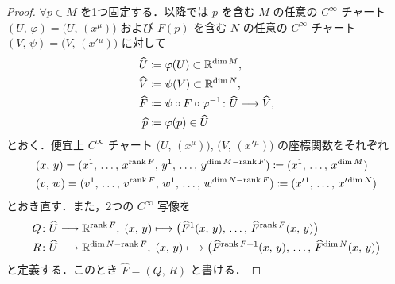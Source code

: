 \documentclass[TQFT_main]{subfiles}
\begin{document}
\begin{proof}
    $\forall p \in M$ を1つ固定する．以降では $p$ を含む $M$ の任意の $C^\infty$ チャート $(U,\, \varphi) = \bigl( U,\, (x^\mu) \bigr) $ および $F(p)$ を含む $N$ の任意の $C^\infty$ チャート $(V,\, \psi) = \bigl( V,\, (x'{}^\mu) \bigr) $ に対して
    \begin{align}
        \widehat{U} &\coloneqq \varphi(U) \subset \mathbb{R}^{\dim M}, \\
        \widehat{V} &\coloneqq \psi(V) \subset \mathbb{R}^{\dim N}, \\
        \widehat{F} &\coloneqq \psi \circ F \circ \varphi^{-1} \colon \widehat{U} \longrightarrow \widehat{V}, \\
        \widehat{p} &\coloneqq \varphi(p) \in \widehat{U}
    \end{align}
    とおく．便宜上 $C^\infty$ チャート $\bigl(U,\, (x^\mu)\bigr),\, \bigl(V,\, (x'{}^\mu)\bigr)$ の座標関数をそれぞれ
    \begin{align}
        &(x,\, y) = (x^1,\, \dots,\, x^{\rank F},\, y^1,\, \dots,\, y^{\dim M - \rank F})
        \coloneqq (x^1,\, \dots,\, x^{\dim M})  \\
        &(v,\, w) = (v^1,\, \dots,\, v^{\rank F},\, w^1,\, \dots,\, w^{\dim N - \rank F})
        \coloneqq (x'{}^1,\, \dots,\, x'{}^{\dim N}) 
    \end{align}
    とおき直す．また，2つの $C^\infty$ 写像を
    \begin{align}
        Q \colon \widehat{U} &\longrightarrow \mathbb{R}^{\rank F},\; (x,\, y) \longmapsto \bigl( \widehat{F}^1(x,\, y),\, \dots,\, \widehat{F}^{\rank F} (x,\, y) \bigr) \\
        R \colon \widehat{U} &\longrightarrow \mathbb{R}^{\dim N - \rank F},\; (x,\, y) \longmapsto \bigl( \widehat{F}^{\rank F + 1}(x,\, y),\, \dots,\, \widehat{F}^{\dim N} (x,\, y) \bigr)
    \end{align}
    と定義する．このとき $\widehat{F} = (Q,\, R)$ と書ける．
    

\end{proof}
\end{document}

